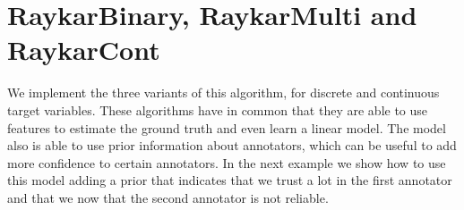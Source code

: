 \documentclass[letterpaper,10pt,english]{sphinxmanual}
\begin{document}
\section{RaykarBinary, RaykarMulti and RaykarCont}
\label{\detokenize{usage/examples:raykarbinary-raykarmulti-and-raykarcont}}
We implement the three variants of this algorithm, for discrete and continuous target variables.
These algorithms have in common that they are able to use features to estimate the ground truth
and even learn a linear model. The model also is able to use prior information about annotators,
which can be useful to add more confidence to certain annotators. In the next example we show
how to use this model adding a prior that indicates that we trust a lot in the first annotator
and that we now that the second annotator is not reliable.
\end{document}
